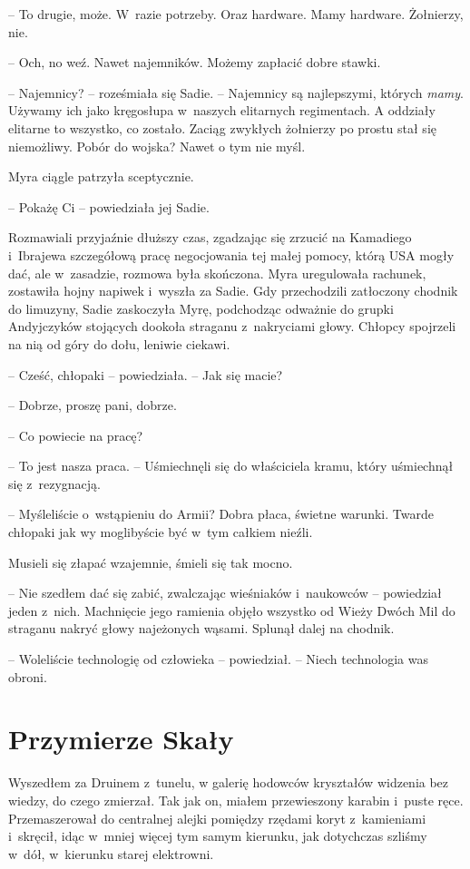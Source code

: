 \documentclass[oneside,polish,11pt,sfheadings]{mwbk}
\begin{document}
-- To drugie, może. W~razie potrzeby. Oraz hardware. Mamy hardware.
Żołnierzy, nie.

-- Och, no weź. Nawet najemników. Możemy zapłacić dobre stawki.

-- Najemnicy? -- roześmiała się Sadie. -- Najemnicy są najlepszymi, których
\textit{mamy}. Używamy ich jako kręgosłupa w~naszych elitarnych
regimentach. A oddziały elitarne to wszystko, co zostało. Zaciąg
zwykłych żołnierzy po prostu stał się niemożliwy. Pobór do wojska? Nawet
o tym nie myśl.

Myra ciągle patrzyła sceptycznie. 

-- Pokażę Ci -- powiedziała jej Sadie.

Rozmawiali przyjaźnie dłuższy czas, zgadzając się zrzucić na Kamadiego i~Ibrajewa szczegółową pracę negocjowania tej małej pomocy, którą USA
mogły dać, ale w~zasadzie, rozmowa była skończona. Myra uregulowała
rachunek, zostawiła hojny napiwek i~wyszła za Sadie. Gdy przechodzili
zatłoczony chodnik do limuzyny, Sadie zaskoczyła Myrę, podchodząc
odważnie do grupki Andyjczyków stojących dookoła straganu z~nakryciami
głowy. Chłopcy spojrzeli na nią od góry do dołu, leniwie ciekawi.

-- Cześć, chłopaki -- powiedziała. -- Jak się macie?

-- Dobrze, proszę pani, dobrze.

-- Co powiecie na pracę?

-- To jest nasza praca. -- Uśmiechnęli się do właściciela kramu, który
uśmiechnął się z~rezygnacją.

-- Myśleliście o~wstąpieniu do Armii? Dobra płaca, świetne warunki.
Twarde chłopaki jak wy moglibyście być w~tym całkiem nieźli.

Musieli się złapać wzajemnie, śmieli się tak mocno.

-- Nie szedłem dać się zabić, zwalczając wieśniaków i~naukowców -- powiedział jeden z~nich. Machnięcie jego ramienia objęło wszystko od
Wieży Dwóch Mil do straganu nakryć głowy najeżonych wąsami. Splunął
dalej na chodnik.

-- Woleliście technologię od człowieka -- powiedział. -- Niech technologia
was obroni.


\chapter{Przymierze Skały}

Wyszedłem za Druinem z~tunelu, w galerię hodowców kryształów widzenia
bez wiedzy, do czego zmierzał. Tak jak on, miałem przewieszony karabin i~puste ręce. Przemaszerował do centralnej alejki pomiędzy rzędami koryt z~kamieniami i~skręcił, idąc w~mniej więcej tym samym kierunku, jak
dotychczas szliśmy w~dół, w~kierunku starej elektrowni.
\end{document}
